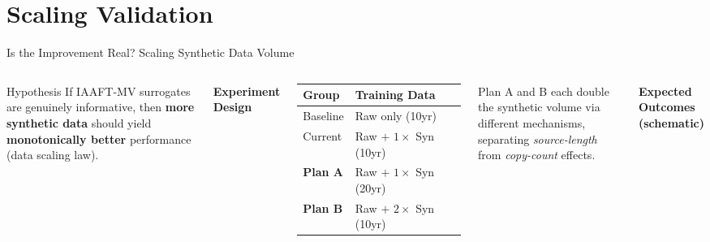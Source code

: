 \documentclass[aspectratio=169,10pt]{beamer}
\begin{document}
\section{Scaling Validation}

\begin{frame}{Is the Improvement Real? Scaling Synthetic Data Volume}
  \begin{columns}[T]
      \begin{block}{Hypothesis}
        If IAAFT-MV surrogates are genuinely informative, then
        \textbf{more synthetic data} should yield
        \textbf{monotonically better} performance (data scaling law).
      \end{block}
      \vspace{0.5em}

      \textbf{Experiment Design}
      \vspace{0.2em}

      \begin{tabular}{@{}ll@{}}
        \toprule
        \textbf{Group} & \textbf{Training Data} \\
        \midrule
        Baseline  & Raw only (10yr) \\
        Current   & Raw $+$ $1\times$ Syn (10yr) \\
        \midrule
        \textbf{Plan A} & Raw $+$ $1\times$ Syn (20yr) \\
        \textbf{Plan B} & Raw $+$ $2\times$ Syn (10yr) \\
        \bottomrule
      \end{tabular}
      \vspace{0.3em}

      {\small Plan A and B each double the synthetic volume via
       different mechanisms, separating \emph{source-length}
       from \emph{copy-count} effects.}

      \textbf{Expected Outcomes (schematic)}
      \vspace{0.2em}


\end{columns}
\end{frame}
\end{document}
